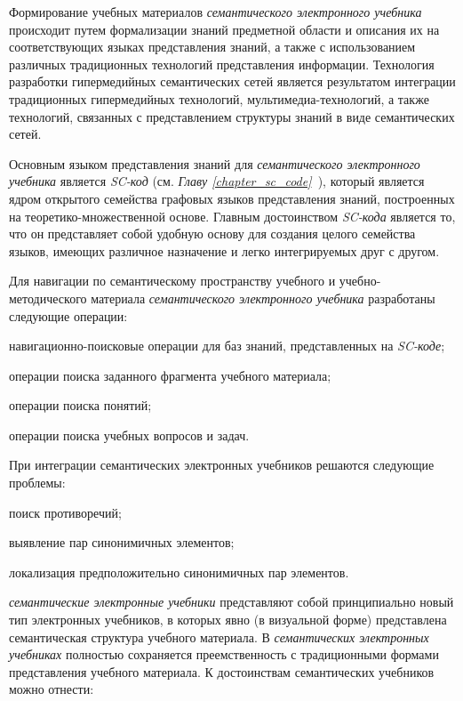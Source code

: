 Формирование учебных материалов \textit{семантического электронного учебника} происходит путем формализации знаний предметной области и описания их на соответствующих языках представления знаний, а также с использованием различных традиционных технологий представления информации. Технология разработки гипермедийных семантических сетей является результатом интеграции традиционных гипермедийных технологий, мультимедиа-технологий, а также технологий, связанных с представлением структуры знаний в виде семантических сетей.

Основным языком представления знаний для \textit{семантического электронного учебника} является \textit{SC-код} (см. \textit{Главу \ref{chapter_sc_code}~}), который является ядром открытого семейства графовых языков представления знаний, построенных на теоретико-множественной основе. Главным достоинством \textit{SC-кода} является то, что он представляет собой удобную основу для создания целого семейства языков, имеющих различное назначение и легко интегрируемых друг с другом.

Для навигации по семантическому пространству учебного и учебно-методического материала \textit{семантического электронного учебника} разработаны следующие операции:

\begin{textitemize}
	\item навигационно-поисковые операции для баз знаний, представленных на \textit{SC-коде};
	\item операции поиска заданного фрагмента учебного материала;
	\item операции поиска понятий;
	\item операции поиска учебных вопросов и задач.
\end{textitemize}

При интеграции семантических электронных учебников решаются следующие проблемы:

\begin{textitemize}
	\item поиск противоречий;
	\item выявление пар синонимичных элементов;
	\item локализация предположительно синонимичных пар элементов.
\end{textitemize}

\textit{семантические электронные учебники} представляют собой принципиально новый тип электронных учебников, в которых явно (в визуальной форме) представлена семантическая структура учебного материала. В \textit{семантических электронных учебниках} полностью сохраняется преемственность с традиционными формами представления учебного материала. К достоинствам семантических учебников можно отнести:

